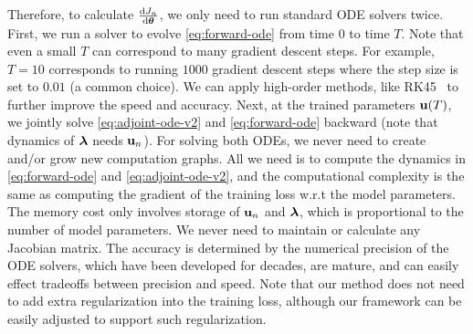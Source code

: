 Therefore, to calculate $\frac{{\rm d} J_n}{{\rm d} \boldsymbol{\theta}}$, we only need to run standard ODE solvers twice. First, we run a solver to evolve \eqref{eq:forward-ode} from time $0$ to time $T$. Note that even a small $T$ can correspond to many gradient descent steps. For example, $T = 10$ corresponds to running $1000$ gradient descent steps where the step size is set to $0.01$ (a common choice). We can apply high-order methods, like RK45~\citep{dormand1980family} to further improve the speed and accuracy. Next, at the trained parameters ${\bf u}(T)$, we jointly solve \eqref{eq:adjoint-ode-v2} and \eqref{eq:forward-ode} backward (note that dynamics of $\boldsymbol{\lambda}$ needs ${\bf u}_n$). For solving both ODEs, we never need to create and/or grow  new computation graphs. All we need is to compute the dynamics in \eqref{eq:forward-ode} and \eqref{eq:adjoint-ode-v2}, and the computational complexity is the same as computing the gradient of the training loss w.r.t the model parameters. The memory cost only involves storage of ${\bf u}_n$ and $\boldsymbol{\lambda}$, which is proportional to the number of model parameters. We never need to maintain or calculate any Jacobian matrix. The accuracy is determined by the numerical precision of the ODE solvers, which have been developed for decades, are mature, and can easily effect tradeoffs between precision and speed.  Note that our method does not need to add extra regularization into the training loss, although our framework can be easily adjusted to support such regularization. 

